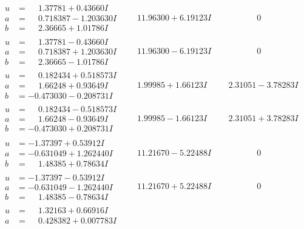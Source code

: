 \documentclass[1p]{elsarticle_modified}
\theoremstyle{definition}
\begin{document}
$$\begin{array}{c|c|c}
\begin{aligned}
u &= \phantom{-}1.37781 + 0.43660 I \\
a &= \phantom{-}0.718387 - 1.203630 I \\
b &= \phantom{-}2.36665 + 1.01786 I\end{aligned}
 & \phantom{-}11.96300 + 6.19123 I & \phantom{-0.000000 } 0 \\ \hline\begin{aligned}
u &= \phantom{-}1.37781 - 0.43660 I \\
a &= \phantom{-}0.718387 + 1.203630 I \\
b &= \phantom{-}2.36665 - 1.01786 I\end{aligned}
 & \phantom{-}11.96300 - 6.19123 I & \phantom{-0.000000 } 0 \\ \hline\begin{aligned}
u &= \phantom{-}0.182434 + 0.518573 I \\
a &= \phantom{-}1.66248 + 0.93649 I \\
b &= -0.473030 - 0.208731 I\end{aligned}
 & \phantom{-}1.99985 + 1.66123 I & \phantom{-}2.31051 - 3.78283 I \\ \hline\begin{aligned}
u &= \phantom{-}0.182434 - 0.518573 I \\
a &= \phantom{-}1.66248 - 0.93649 I \\
b &= -0.473030 + 0.208731 I\end{aligned}
 & \phantom{-}1.99985 - 1.66123 I & \phantom{-}2.31051 + 3.78283 I \\ \hline\begin{aligned}
u &= -1.37397 + 0.53912 I \\
a &= -0.631049 + 1.262440 I \\
b &= \phantom{-}1.48385 + 0.78634 I\end{aligned}
 & \phantom{-}11.21670 - 5.22488 I & \phantom{-0.000000 } 0 \\ \hline\begin{aligned}
u &= -1.37397 - 0.53912 I \\
a &= -0.631049 - 1.262440 I \\
b &= \phantom{-}1.48385 - 0.78634 I\end{aligned}
 & \phantom{-}11.21670 + 5.22488 I & \phantom{-0.000000 } 0 \\ \hline\begin{aligned}
u &= \phantom{-}1.32163 + 0.66916 I \\
a &= \phantom{-}0.428382 + 0.007783 I \\

\end{aligned}
\end{array}$$
\end{document}
